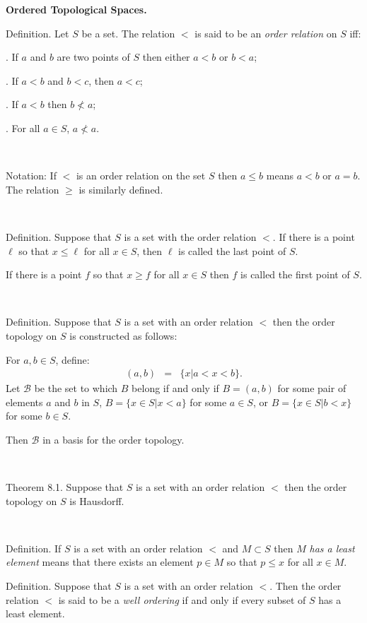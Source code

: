 \documentclass[12pt, std]{article}
\begin{document}
\begin{center} \textbf{Ordered Topological Spaces.} \end{center}

Definition. Let $S$ be a set.  The relation $<$ is said to be an
\textit{order relation} on $S$ iff:

.  If $a$ and $b$ are two points of $S$ then either $a<b$ or
$b<a$;

.  If $a<b$ and $b<c$, then $a<c$;

.  If $a<b$ then $b \nless a$;

.  For all $a \in S$, $a \nless a$.

\

Notation:  If $<$ is an order relation on the set $S$ then $a \le b$ means $a<b$ or $a=b$.  The relation $\ge$ is similarly defined.

\

Definition.  Suppose that $S$ is a set with the order relation $<$.  If there is a point $\ell$ so that $x \le \ell$ for all $x \in S$, then $\ell$ is called the last point of $S$.

If there is a point $f$ so that $x \ge f$ for all $x \in S$ then $f$ is called the first point of $S$.

\

Definition.  Suppose that $S$ is a set with an order relation $<$
then the order topology on $S$ is constructed as follows:

For $a, b \in S$, define:
\begin{eqnarray*}
(a,b) & = &  \{x | a < x < b\}.
\end{eqnarray*}
\qquad Let $\mathcal{B}$ be the set to which $B$ belong if and only
if $B= (a,b) $ for some pair of elements $a$ and $b$ in $S$, $B=
\{ x \in S | x < a \}$ for some $a \in S$,  or $B= \{ x \in S | b <
x \}$ for some $b\in S$.

Then $\mathcal{B}$ in a basis for the order topology.

\

Theorem 8.1.  Suppose that $S$ is a set with an order relation $<$
then the order topology on $S$ is Hausdorff.

\

Definition.  If $S$ is a set with an order relation $<$ and $M
\subset S$ then $M$ \textit{has a least element} means that there
exists an element $p \in M$ so that $p \le x$ for all $x\in M$.


Definition.  Suppose that $S$ is a set with an order relation $<$.
Then the order relation $<$ is said to be a \textit{well ordering}
if and only if every subset of $S$ has a least element.
\end{document}
